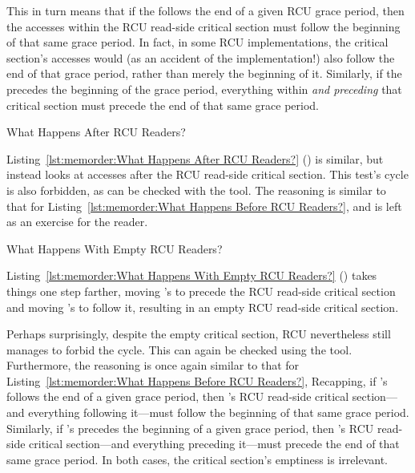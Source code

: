 This in turn means that if the  follows the end of a given
RCU grace period, then the accesses within the RCU read-side critical
section must follow the beginning of that same grace period.
In fact, in some RCU implementations, the critical section's accesses
would (as an accident of the implementation!) also follow the end of
that grace period, rather than merely the beginning of it.
Similarly, if the  precedes the beginning of the grace
period, everything within \emph{and preceding} that critical section
must precede the end of that same grace period.

\begin{listing}[tb]

\caption{What Happens After RCU Readers?}
\label{lst:memorder:What Happens After RCU Readers?}
\end{listing}

Listing~\ref{lst:memorder:What Happens After RCU Readers?}
()
is similar, but instead looks at accesses after the RCU read-side
critical section.
This test's cycle is also forbidden, as can be checked with the 
tool.
The reasoning is similar to that for
Listing~\ref{lst:memorder:What Happens Before RCU Readers?},
and is left as an exercise for the reader.

\begin{listing}[tb]

\caption{What Happens With Empty RCU Readers?}
\label{lst:memorder:What Happens With Empty RCU Readers?}
\end{listing}

Listing~\ref{lst:memorder:What Happens With Empty RCU Readers?}
()
takes things one step farther, moving 's 
to precede the RCU read-side critical section and moving
's  to follow it, resulting in an
empty RCU read-side critical section.

Perhaps surprisingly, despite the empty critical section, RCU nevertheless
still manages to forbid the cycle.
This can again be checked using the  tool.
Furthermore, the reasoning is once again similar to that for
Listing~\ref{lst:memorder:What Happens Before RCU Readers?},
Recapping, if 's  follows the end of a given
grace period, then 's RCU read-side critical section---and
everything following it---must follow the beginning of that same grace
period.
Similarly, if 's  precedes the beginning of a
given grace period, then 's RCU read-side critical section---and
everything preceding it---must precede the end of that same grace period.
In both cases, the critical section's emptiness is irrelevant.


